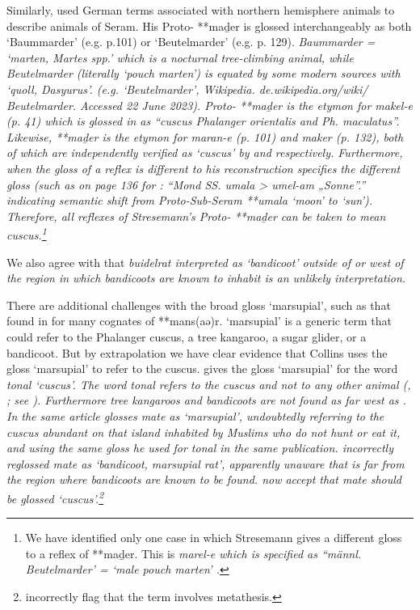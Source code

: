 Similarly, \citet{Stresemann1927} used German terms associated with northern
hemisphere animals to describe animals of Seram.
His Proto- **maḏer is glossed interchangeably as both ‘Baummarder’ (e.g.
p.101) or ‘Beutelmarder’ (e.g. p. 129).
\it{Baummarder} = ‘marten, \it{Martes spp.}’ which is a nocturnal
tree-climbing animal, while \it{Beutelmarder} (literally ‘pouch marten’) is equated
by some modern sources with ‘quoll, \it{Dasyurus}’.
(e.g. ‘Beutelmarder’, Wikipedia. de.wikipedia.org/wiki/ Beutelmarder.
Accessed 22 June 2023).
Proto- **maḏer is the etymon for  \it{makel-e} (p. 41)
which is glossed in \citet[130]{Stresemann1918} as
``cuscus \it{Phalanger orientalis} and \it{Ph. maculatus}''.
Likewise, **maḏer is the etymon for
 \it{maran-e} (p. 101) and  \it{maker} (p.
132), both of which are independently verified as ‘cuscus’ by
\citet[196f]{Ellen1972,Ellen1993} and \citet[304f]{vanEkris1864} respectively.
Furthermore, when the gloss of a reflex is different to his reconstruction
\citet{Stresemann1927} specifies the different gloss (such as on page 136
for : “Mond SS. \it{umala} > \it{umel-am} „Sonne”.” indicating semantic shift
from Proto-Sub-Seram **umala ‘moon’ to  ‘sun’).
Therefore, all reflexes of Stresemann’s Proto- **maḏer can
be taken to mean cuscus.\footnote{
		We have identified only one case in which Stresemann gives a different
		gloss to a reflex of **maḏer. This is  \it{marel-e} which is
		specified as ``männl. Beutelmarder' = `male pouch marten' \citep[180]{Stresemann1927}.}

We also agree with \citet{Schapper2011} that \it{buidelrat} interpreted
as ‘bandicoot’ outside of or west of the region in which bandicoots
are known to inhabit is an unlikely interpretation.

There are additional challenges with the broad  gloss
‘marsupial’, such as that found in \citet{Collins1983} for many cognates of **mans(aə)r.
 ‘marsupial’ is a generic term that could refer to the
Phalanger cuscus, a tree kangaroo, a sugar glider, or a bandicoot.
But by extrapolation we have clear evidence that Collins uses
the gloss ‘marsupial’ to refer to the cuscus.
\citet[42]{Collins1981} gives the gloss ‘marsupial’ for the  word \it{tonal} ‘cuscus’.
The  word \it{tonal} refers to the cuscus
and not to any other animal (\cite[19]{Grimes1991c}, \cite[942]{GrimesGrimes2020}; see ).
Furthermore tree kangaroos and bandicoots are not found as far west as .
In the same article \citet[36]{Collins1981} glosses  \it{mate}
as ‘marsupial’, undoubtedly referring to the cuscus abundant on that island inhabited
by Muslims who do not hunt or eat it,
and using the same gloss he used for  \it{tonal} in the same publication.
\citet[241]{Blust1982} incorrectly reglossed  \it{mate}
as ‘bandicoot, marsupial rat’, apparently unaware that  is far from the
region where bandicoots are known to be found.
\citet{BlustTrussel2020} now accept that  \it{mate} should
be glossed ‘cuscus’.\footnote{
		\citet{BlustTrussel2020} incorrectly
		flag that the  term involves metathesis.}

